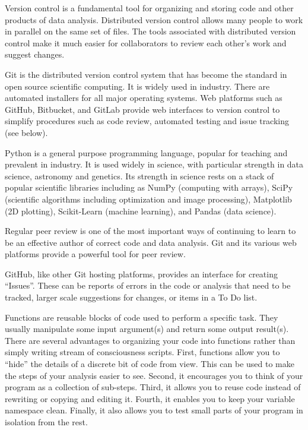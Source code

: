 Version control is a fundamental tool for organizing and storing code and
other products of data analysis.
Distributed version control allows many people to work in parallel on the
same set of files.
The tools associated with distributed version control make it much easier
for collaborators to review each other's work and suggest changes.

Git is the distributed version control system that has become the standard in
open source scientific computing. It is widely used in industry.
There are automated installers for all major operating systems.
Web platforms such as GitHub, Bitbucket, and GitLab provide web interfaces
to version control to simplify procedures such as code review, automated
testing and issue tracking (see below).

Python is a general purpose programming language,
popular for teaching and prevalent in industry.
It is used widely in science, with particular strength in data science,
astronomy and genetics.
Its strength in science rests on a stack of popular scientific libraries including
as NumPy (computing with arrays), SciPy (scientific algorithms
including optimization and image processing), Matplotlib (2D plotting),
Scikit-Learn (machine learning), and Pandas (data science).

Regular peer review is one of the most important ways of continuing to learn
to be an effective author of correct code and data analysis.  Git and its
various web platforms provide a powerful tool for peer review.

GitHub, like other Git hosting platforms, provides an interface for creating
``Issues''.  These can be reports of errors in the code or analysis that need
to be tracked, larger scale suggestions for changes, or items in a To Do list.

Functions are reusable blocks of code used to perform a specific task.
They usually manipulate some input argument(s) and return some output
result(s).
There are several advantages to organizing your code into functions rather
than simply writing stream of consciousness scripts.
First, functions allow you to ``hide'' the details of a discrete bit of
code from view.
This can be used to make the steps of your analysis easier to see.
Second, it encourages you to think of your program as a collection of sub-steps.
Third, it allows you to reuse code instead of rewriting or copying and editing
it.
Fourth, it enables you to keep your variable namespace clean.
Finally, it also allows you to test small parts of your program in isolation
from the rest.


